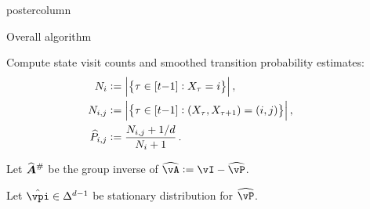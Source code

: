 \documentclass[notheorems,final]{beamer}
\newcommand{\compresslist}{%
  \setlength{\itemsep}{1pt}%
  \setlength{\parskip}{0pt}%
  \setlength{\parsep}{0pt}%
  \setlength{\leftmargin}{0.7cm}%
}
\newcommand\gap{\ensuremath{\gamma_{\star}}}
\newcommand\giAh{\ensuremath{\widehat{\boldsymbol{A}}^{\raisebox{-2.9pt}{$\scriptstyle\#$}}}}
\begin{document}
\begin{frame}{}
\begin{columns}
\begin{column}{0.24\textwidth}
\begin{beamercolorbox}[center,wd=\textwidth]{postercolumn}
\begin{minipage}[T]{.95\textwidth}
{%
%
%
%
%
%
%
%
%
%
%
              \begin{block}{Overall algorithm}
                \begin{algorithmic}[1]
                  \STATE Compute state visit counts and smoothed transition
                  probability estimates:
                  \begin{equation}
                    \kern-25pt
                    \begin{aligned}
                      N_i & :=
                      \Abs{
                        \Braces{
                          \tau \in [t{-}1] : X_\tau = i
                        }
                      }
                      \,, \\
                      N_{i,j} & :=
                      \Abs{
                        \Braces{
                          \tau \in [t{-}1] : (X_\tau,X_{\tau+1}) = (i,j)
                        }
                      }
                      \,, \\
                      \wh{P}_{i,j}
                      & :=
                      \frac{N_{i,j} + 1/d}{N_i + 1}
                      \,.
                    \end{aligned}
                    \notag
                  \end{equation}

                  \STATE Let $\giAh$ be the group inverse of $\wh\vA := \vI -
                  \wh\vP$.

                  \STATE Let $\hat\vpi \in \Delta^{d-1}$ be stationary
                  distribution for $\wh\vP$.


\end{algorithmic}
\end{block}}
\end{minipage}
\end{beamercolorbox}
\end{column}
\end{columns}
\end{frame}
\end{document}
